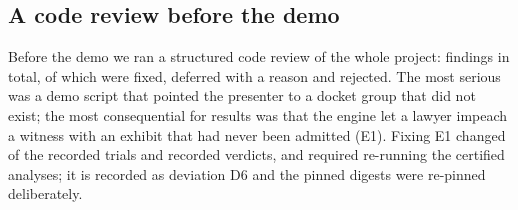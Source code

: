 \subsection{A code review before the demo}
Before the demo we ran a structured code review of the whole project: \ReviewTotal{} findings in total, of which \ReviewFixed{} were fixed, \ReviewDeferred{} deferred with a reason and \ReviewRejected{} rejected. The most serious was a demo script that pointed the presenter to a docket group that did not exist; the most consequential for results was that the engine let a lawyer impeach a witness with an exhibit that had never been admitted (E1). Fixing E1 changed \EOneDigests{} of the \EOneTrials{} recorded trials and \EOneFlipped{} recorded verdicts, and required re-running the certified analyses; it is recorded as deviation D6 and the pinned digests were re-pinned deliberately.

